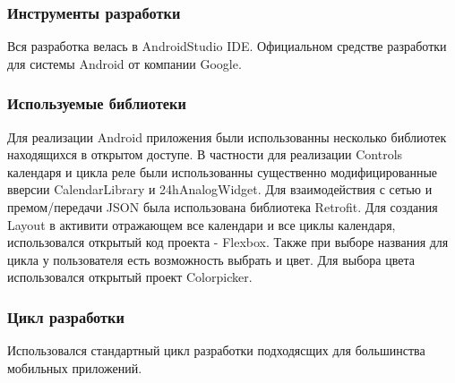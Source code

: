 \subsubsection{Инструменты разработки}
Вся разработка велась в AndroidStudio IDE. Официальном средстве разработки для системы Android от компании Google.

\subsubsection{Используемые библиотеки}
Для реализации Android приложения были использованны несколько библиотек находящихся в открытом доступе. В частности для реализации Controls календаря и цикла реле были использованны существенно модифицированные вверсии CalendarLibrary и 24hAnalogWidget. Для взаимодействия с сетью и премом/передачи JSON была использована библиотека Retrofit. Для создания Layout в активити отражающем все календари и все циклы календаря, использовался открытый код проекта - Flexbox. Также при выборе названия для цикла у пользователя есть возможность выбрать и цвет. Для выбора цвета использовался открытый проект Colorpicker.

\subsubsection{Цикл разработки}
Использовался стандартный цикл разработки подходясщих для большинства мобильных приложений.